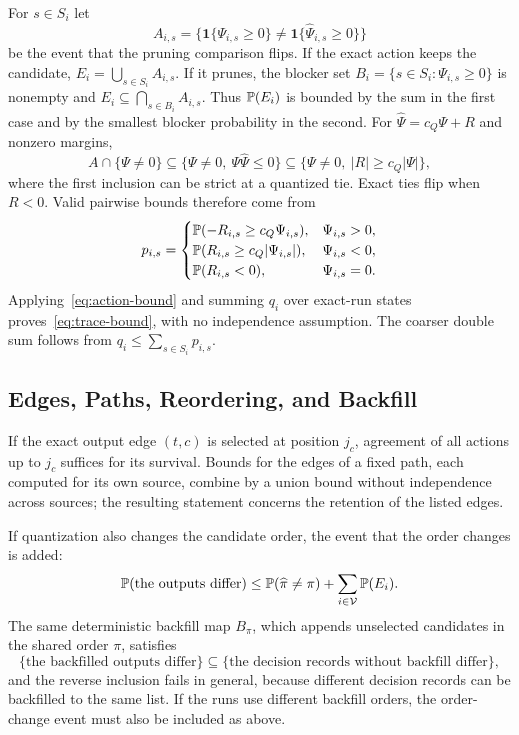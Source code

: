 For $s\in S_i$ let
\begin{equation}
A_{i,s}=\bigl\{\mathbf 1\{\Psi_{i,s}\ge0\}\ne\mathbf 1\{\widehat\Psi_{i,s}\ge0\}\bigr\}
\end{equation}
be the event that the pruning comparison flips. If the exact action keeps the candidate, $E_i=\bigcup_{s\in S_i}A_{i,s}$. If it prunes, the blocker set $B_i=\{s\in S_i:\Psi_{i,s}\ge0\}$ is nonempty and $E_i\subseteq\bigcap_{s\in B_i}A_{i,s}$. Thus $\mathbb{P}(E_i)$ is bounded by the sum in the first case and by the smallest blocker probability in the second. For $\widehat\Psi=c_Q\Psi+R$ and nonzero margins,
\begin{equation}
A\cap\{\Psi\ne0\}\subseteq\{\Psi\ne0,\ \Psi\widehat\Psi\le0\}\subseteq\{\Psi\ne0,\ |R|\ge c_Q|\Psi|\},
\end{equation}
where the first inclusion can be strict at a quantized tie. Exact ties flip when $R<0$. Valid pairwise bounds therefore come from
\begin{equation}
p_{i,s}=\begin{cases}
\mathbb{P}(-R_{i,s}\ge c_Q\Psi_{i,s}),&\Psi_{i,s}>0,\\
\mathbb{P}(R_{i,s}\ge c_Q|\Psi_{i,s}|),&\Psi_{i,s}<0,\\
\mathbb{P}(R_{i,s}<0),&\Psi_{i,s}=0.
\end{cases}
\label{eq:app-trace-risk}
\end{equation}
Applying~\eqref{eq:action-bound} and summing $q_i$ over exact-run states proves~\eqref{eq:trace-bound}, with no independence assumption. The coarser double sum follows from $q_i\le\sum_{s\in S_i}p_{i,s}$.

\subsection{Edges, Paths, Reordering, and Backfill}

If the exact output edge $(t,c)$ is selected at position $j_c$, agreement of all actions up to $j_c$ suffices for its survival. Bounds for the edges of a fixed path, each computed for its own source, combine by a union bound without independence across sources; the resulting statement concerns the retention of the listed edges.

If quantization also changes the candidate order, the event that the order changes is added:
\begin{equation}
\mathbb{P}(\text{the outputs differ})\le\mathbb{P}(\widehat\pi\ne\pi)+\sum_{i\in\mathcal V}\mathbb{P}(E_i).
\end{equation}
The same deterministic backfill map $B_\pi$, which appends unselected candidates in the shared order $\pi$, satisfies
\begin{equation}
\{\text{the backfilled outputs differ}\}\subseteq\{\text{the decision records without backfill differ}\},
\end{equation}
and the reverse inclusion fails in general, because different decision records can be backfilled to the same list. If the runs use different backfill orders, the order-change event must also be included as above.

